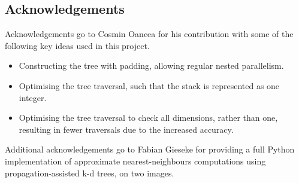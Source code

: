 \subsection{Acknowledgements}


Acknowledgements go to Cosmin Oancea for his contribution with some of the following key ideas used in this project. 

\begin{itemize}
\item Constructing the tree with padding, allowing regular nested parallelism. 
\item Optimising the tree traversal, such that the stack is represented as one integer.
\item Optimising the tree traversal to check all dimensions, rather than one, resulting in fewer traversals due to the increased accuracy. 
\end{itemize}

Additional acknowledgements go to Fabian Gieseke for providing a full Python implementation of approximate nearest-neighbours computations using propagation-assisted k-d trees, on two images. 


